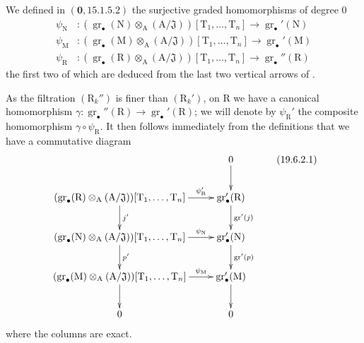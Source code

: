 \begin{env}[19.6.2]
\label{IV.19.6.2}
We defined in $(\mathbf{0},15.1.5.2)$ the surjective graded homomorphisms of degree $0$
\begin{align*}
  \psi_\mathrm{N} &: (\operatorname{gr}_\bullet(\mathrm{N})\otimes_\mathrm{A}(\mathrm{A}/\mathfrak{J}))[\mathrm{T}_1,\ldots,\mathrm{T}_n] \to \operatorname{gr}_\bullet'(\mathrm{N}) \\
  \psi_\mathrm{M} &: (\operatorname{gr}_\bullet(\mathrm{M})\otimes_\mathrm{A}(\mathrm{A}/\mathfrak{J}))[\mathrm{T}_1,\ldots,\mathrm{T}_n] \to \operatorname{gr}_\bullet'(\mathrm{M}) \\
  \psi_\mathrm{R} &: (\operatorname{gr}_\bullet(\mathrm{R})\otimes_\mathrm{A}(\mathrm{A}/\mathfrak{J}))[\mathrm{T}_1,\ldots,\mathrm{T}_n] \to \operatorname{gr}_\bullet''(\mathrm{R})
\end{align*}
the first two of which are deduced from the last two vertical arrows of .

As the filtration $(\mathrm{R}_k'')$ is finer than $(\mathrm{R}_k')$, on $\mathrm{R}$ we have a canonical homomorphism $\gamma:\operatorname{gr}_\bullet''(\mathrm{R})\to\operatorname{gr}_\bullet'(\mathrm{R})$; we will denote by $\psi_\mathrm{R}'$ the composite homomorphism $\gamma\circ\psi_\mathrm{R}$. It then follows immediately from the definitions that we have a commutative diagram
\[
\xymatrix{
  & 0 \ar[d] \\
  (\operatorname{gr}_\bullet(\mathrm{R})\otimes_\mathrm{A}(\mathrm{A}/\mathfrak{J}))[\mathrm{T}_1,\ldots,\mathrm{T}_n] \ar[r]^-{\psi_\mathrm{R}'} \ar[d]^{j'} & \operatorname{gr}_\bullet'(\mathrm{R}) \ar[d]^{\operatorname{gr}'(j)} \\
  (\operatorname{gr}_\bullet(\mathrm{N})\otimes_\mathrm{A}(\mathrm{A}/\mathfrak{J}))[\mathrm{T}_1,\ldots,\mathrm{T}_n] \ar[r]^-{\psi_\mathrm{N}} \ar[d]^{p'} & \operatorname{gr}_\bullet'(\mathrm{N}) \ar[d]^{\operatorname{gr}'(p)} \\
  (\operatorname{gr}_\bullet(\mathrm{M})\otimes_\mathrm{A}(\mathrm{A}/\mathfrak{J}))[\mathrm{T}_1,\ldots,\mathrm{T}_n] \ar[r]^-{\psi_\mathrm{M}} \ar[d] & \operatorname{gr}_\bullet'(\mathrm{M}) \ar[d] \\
  0 & 0
}
\tag{19.6.2.1}
\label{IV.19.6.2.1}
\]
where the columns are exact.
\end{env}


